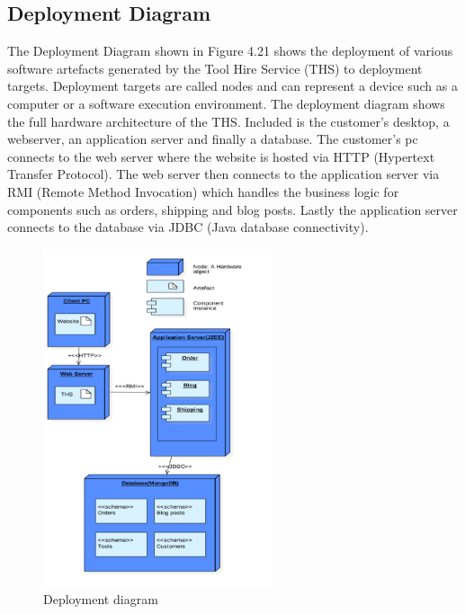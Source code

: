 \hypertarget{deployment-diagram}{%
\subsection{Deployment Diagram}\label{deployment-diagram}}

The Deployment Diagram shown in Figure 4.21 shows the deployment of
various software artefacts generated by the Tool Hire Service (THS) to
deployment targets. Deployment targets are called nodes and can
represent a device such as a computer or a software execution
environment. The deployment diagram shows the full hardware architecture
of the THS. Included is the customer's desktop, a webserver, an
application server and finally a database. The customer's pc connects to
the web server where the website is hosted via HTTP (Hypertext Transfer
Protocol). The web server then connects to the application server via
RMI (Remote Method Invocation) which handles the business logic for
components such as orders, shipping and blog posts. Lastly the
application server connects to the database via JDBC (Java database
connectivity).

\begin{figure}[H]
      \centering
      \includegraphics[trim = 0 0 0 0, clip, width=0.6\textwidth]{TempImg/depD.png}
      \caption{Deployment diagram}
\end{figure}



\newpage

